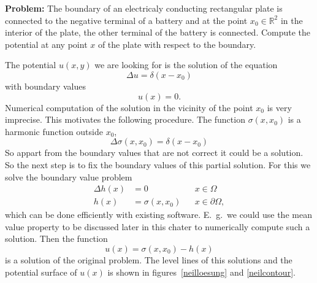 {\parindent 0pt
\medskip
{\bf Problem:}
The boundary of an electricaly conducting rectangular plate is connected
to the negative terminal of a battery and at the point
$x_0\in\mathbb R^2$ in the interior of the plate, the other terminal
of the battery is connected.
Compute the potential at any point $x$ of the plate with respect to
the boundary.

\medskip
}
The potential
$u(x,y)$
we are looking for is the solution of the equation
\[
\Delta u=\delta(x-x_0)
\]
with boundary values
\[
u(x)=0.
\]
Numerical computation of the solution in the vicinity of the point $x_0$
is very imprecise.
This motivates the following procedure.
The function $\sigma(x,x_0)$ is a harmonic function outside $x_0$,
\[
\Delta\sigma(x,x_0)=\delta(x-x_0)
\]
So appart from the boundary values that are not correct it could be
a solution.
So the next step is to fix the boundary values of this partial solution.
For this we solve the boundary value problem
\begin{align*}
\Delta h(x)&=0&&x\in\Omega\\
h(x)&=\sigma(x,x_0)&&x\in\partial\Omega,
\end{align*}
which can be done efficiently with existing software.
E.~g.~we could use the mean value property to be discussed later in this
chater to numerically compute such a solution.
Then the function
\[
u(x)=\sigma(x,x_0)-h(x)
\]
is a solution of the original problem.
The level lines of this solutions and the potential surface of $u(x)$ is
shown in figures~\ref{neilloesung} and \ref{neilcontour}.

